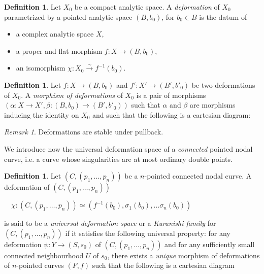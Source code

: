 \documentclass[a4paper,12 pt,titlepage,twoside]{book}
\theoremstyle{plain}
\theoremstyle{theorem}
\theoremstyle{definition}
\newtheorem{defn}[thm]{Definition}
\theoremstyle{remark}
\newtheorem{oss}[thm]{Remark}
\begin{document}
\begin{defn}
	Let $X_0$ be a compact analytic space. A \emph{deformation} of $X_0$ parametrized by a pointed analytic space $(B,b_0)$, for $b_0 \in B$ is the datum of 
	\begin{itemize}
		\item a complex analytic space $X$,
		\item a proper and flat morphism $f \colon X \rightarrow (B,b_0),$
		\item an isomorphism $\chi \colon X_0 \stackrel{\sim}{\longrightarrow} f^{-1}(b_0)$.
	\end{itemize}
\end{defn}
\begin{defn}
	Let $f \colon X \rightarrow (B,b_0)$ and $f'\colon X' \rightarrow (B',b'_0)$ be two deformations of $X_0$. A \emph{morphism of deformations} of $X_0$ is a pair of morphisms $(\alpha \colon X \rightarrow X', \beta \colon (B,b_0) \rightarrow (B',b'_0))$ such that $\alpha$ and $\beta$ are morphisms inducing the identity on $X_0$ and such that the following is a cartesian diagram:
	\begin{center}
	\end{center}
\end{defn}
\begin{oss}\label{rmk: deformations stable under pullback}
	Deformations are stable under pullback.
\end{oss}
We introduce now the universal deformation space of a \emph{connected} pointed nodal curve, i.e. a curve whose singularities are at most ordinary double points.
\begin{defn}
	Let $(C, (p_1, \dots,p_n))$ be a $n$-pointed connected nodal curve. A deformation of $(C, (p_1,\dots,p_n))$ \begin{center}
		$\quad \chi \colon (C,(p_1, \dots,p_n)) \simeq (f^{-1}(b_0), \sigma_1(b_0), \dots \sigma_n(b_0))$
	\end{center}
	is said to be a \emph{universal deformation space} or a \emph{Kuranishi family} for $(C,(p_1,\dots,p_n))$ if it satisfies the following universal property:	for any deformation $\psi \colon Y \rightarrow (S,s_0)$ of $(C,(p_1,\dots,p_n))$ and for any sufficiently small connected neighbourhood $U$ of $s_0$, there exists a \emph{unique} morphism of deformations of $n$-pointed curves $(F,f)$ such that the following is a cartesian diagram \begin{center}
	\end{center}
\end{defn}
\end{document}
